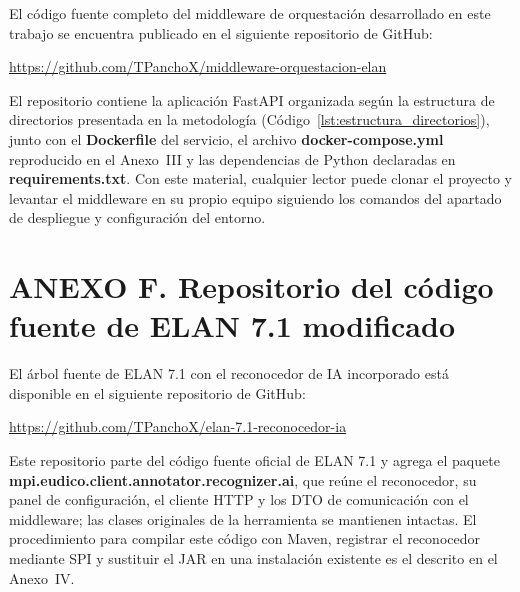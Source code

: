 El código fuente completo del middleware de orquestación desarrollado en este trabajo se encuentra publicado en el siguiente repositorio de GitHub:

\begin{center}
\url{https://github.com/TPanchoX/middleware-orquestacion-elan}
\end{center}

El repositorio contiene la aplicación FastAPI organizada según la estructura de directorios presentada en la metodología (Código~\ref{lst:estructura_directorios}), junto con el \textbf{Dockerfile} del servicio, el archivo \textbf{docker-compose.yml} reproducido en el Anexo~III y las dependencias de Python declaradas en \textbf{requirements.txt}. Con este material, cualquier lector puede clonar el proyecto y levantar el middleware en su propio equipo siguiendo los comandos del apartado de despliegue y configuración del entorno.


\section*{\normalfont ANEXO F. Repositorio del código fuente de ELAN 7.1 modificado}
\label{anx:repo_elan}

El árbol fuente de ELAN 7.1 con el reconocedor de IA incorporado está disponible en el siguiente repositorio de GitHub:

\begin{center}
\url{https://github.com/TPanchoX/elan-7.1-reconocedor-ia}
\end{center}

Este repositorio parte del código fuente oficial de ELAN 7.1 y agrega el paquete \textbf{mpi.eudico.client.annotator.recognizer.ai}, que reúne el reconocedor, su panel de configuración, el cliente HTTP y los DTO de comunicación con el middleware; las clases originales de la herramienta se mantienen intactas. El procedimiento para compilar este código con Maven, registrar el reconocedor mediante SPI y sustituir el JAR en una instalación existente es el descrito en el Anexo~IV.

